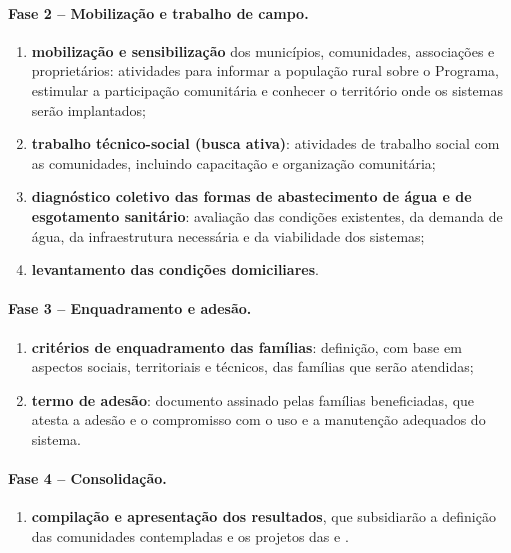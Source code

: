 \paragraph{Fase 2 -- Mobilização e trabalho de campo.}
\begin{enumerate}[label=\alph*), resume]
  \item \textbf{mobilização e sensibilização} dos municípios, comunidades,
        associações e proprietários: atividades para informar a população
        rural sobre o Programa, estimular a participação comunitária e
        conhecer o território onde os sistemas serão implantados;
  \item \textbf{trabalho técnico-social (busca ativa)}: atividades de
        trabalho social com as comunidades, incluindo capacitação e
        organização comunitária;
  \item \textbf{diagnóstico coletivo das formas de abastecimento de água e de
        esgotamento sanitário}: avaliação das condições existentes, da
        demanda de água, da infraestrutura necessária e da viabilidade dos
        sistemas;
  \item \textbf{levantamento das condições domiciliares}.
\end{enumerate}

\paragraph{Fase 3 -- Enquadramento e adesão.}
\begin{enumerate}[label=\alph*), resume]
  \item \textbf{critérios de enquadramento das famílias}: definição, com
        base em aspectos sociais, territoriais e técnicos, das famílias que
        serão atendidas;
  \item \textbf{termo de adesão}: documento assinado pelas famílias
        beneficiadas, que atesta a adesão e o compromisso com o uso e a
        manutenção adequados do sistema.
\end{enumerate}

\paragraph{Fase 4 -- Consolidação.}
\begin{enumerate}[label=\alph*), resume]
  \item \textbf{compilação e apresentação dos resultados}, que subsidiarão a
        definição das comunidades contempladas e os projetos das
         e .
\end{enumerate}

